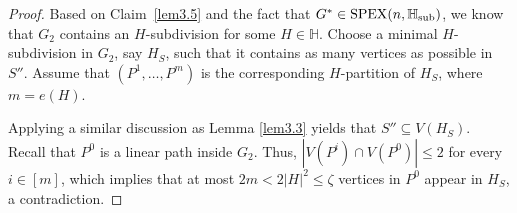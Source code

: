 \documentclass[11pt, a4paper]{article}
\theoremstyle{definition}
\newcommand{\<}{\subseteq}
\begin{document}
\begin{proof}
Based on Claim~\ref{lem3.5} and the fact that $G^*\in {\rm SPEX}(n,\mathbb{H}_{\rm sub})$, we know that $G_2$ contains an $H$-subdivision for some $H\in\mathbb{H}$.
    Choose a minimal $H$-subdivision in $G_2$, say $H_S$, such that it contains as many vertices as possible in $S''$.
    Assume that $(P^1,\ldots,P^{m})$ is the corresponding $H$-partition of $H_S$, where $m=e(H)$. 
    
    Applying a similar discussion as Lemma \ref{lem3.3} yields that $S''\subseteq V(H_S)$. Recall that $P^0$ is a linear path inside $G_2$. Thus, $|V(P^i)\cap V(P^0)|\leq 2$ for every $i\in [m]$, which implies that at most $2m<2|H|^2\leq \zeta$ vertices in $P^0$ appear in $H_S$, a contradiction. 
\end{proof}
\end{document}
